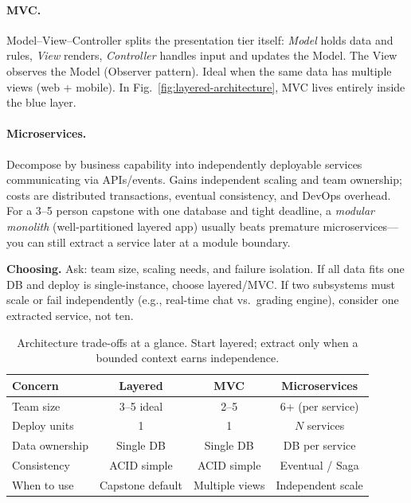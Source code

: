 \paragraph{MVC.} Model--View--Controller splits the presentation tier itself: \emph{Model} holds data and rules, \emph{View} renders, \emph{Controller} handles input and updates the Model. The View observes the Model (Observer pattern). Ideal when the same data has multiple views (web + mobile). In Fig.~\ref{fig:layered-architecture}, MVC lives entirely inside the blue layer.

\paragraph{Microservices.} Decompose by business capability into independently deployable services communicating via APIs/events. Gains independent scaling and team ownership; costs are distributed transactions, eventual consistency, and DevOps overhead. For a 3--5 person capstone with one database and tight deadline, a \emph{modular monolith} (well-partitioned layered app) usually beats premature microservices---you can still extract a service later at a module boundary.

\textbf{Choosing.} Ask: team size, scaling needs, and failure isolation. If all data fits one DB and deploy is single-instance, choose layered/MVC. If two subsystems must scale or fail independently (e.g., real-time chat vs.\ grading engine), consider one extracted service, not ten.

\begin{table}[h]
\centering\small
\begin{tabular}{@{}lccc@{}}
\toprule
Concern & Layered & MVC & Microservices \\
\midrule
Team size & 3--5 ideal & 2--5 & 6+ (per service) \\
Deploy units & 1 & 1 & $N$ services \\
Data ownership & Single DB & Single DB & DB per service \\
Consistency & ACID simple & ACID simple & Eventual / Saga \\
When to use & Capstone default & Multiple views & Independent scale \\
\bottomrule
\end{tabular}
\caption{Architecture trade-offs at a glance. Start layered; extract only when a bounded context earns independence.}
\label{tab:arch-tradeoffs}
\end{table}

